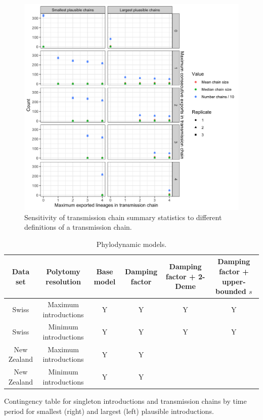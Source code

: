 \documentclass[9pt,twoside,lineno]{pnas-new}
\begin{document}
\begin{figure}
\centering
\includegraphics[width = 11.4cm]{figures/fig_SX_sensitivity_chain_defn.png}
\caption{Sensitivity of transmission chain summary statistics to different definitions of a transmission chain.}  
\label{fig:sensitivity_m_p}
\end{figure}

\newpage
\begin{table}
\caption{Phylodynamic models.}
\label{tab:phylo-models}
\begin{tabular}{cccccc}
Data set & Polytomy resolution & Base model & Damping factor & Damping factor + 2-Deme & Damping factor + upper-bounded $s$ \\
\midrule
Swiss & Maximum introductions & Y & Y & Y & Y \\
Swiss & Minimum introductions & Y & Y & Y & Y \\
New Zealand & Maximum introductions & Y & Y & & \\
New Zealand & Minimum introductions & Y & Y & & \\
\bottomrule
\end{tabular}
\end{table}


\newpage
\begin{table}
\caption{Contingency table for singleton introductions and transmission chains by time period for smallest (right) and largest (left) plausible introductions.}


\label{tab:lockdown-contingency}
\end{table}
\end{document}
